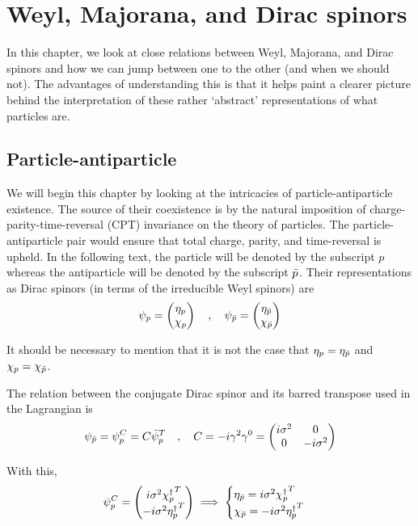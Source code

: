 \chapter{Weyl, Majorana, and Dirac spinors}
\label{ch:4}

In this chapter, we look at close relations between Weyl, Majorana, and Dirac spinors and how we can jump between one to the other (and when we should not). The advantages of understanding this is that it helps paint a clearer picture behind the interpretation of these rather `abstract' representations of what particles are. 

\section{Particle-antiparticle}
\label{ch:4:particle-antiparticle}
We will begin this chapter by looking at the intricacies of particle-antiparticle existence. The source of their coexistence is by the natural imposition of charge-parity-time-reversal (CPT) invariance on the theory of particles. The particle-antiparticle pair would ensure that total charge, parity, and time-reversal is upheld. In the following text, the particle will be denoted by the subscript $p$ whereas the antiparticle will be denoted by the subscript ${\Bar{p}}$. Their representations as Dirac spinors (in terms of the irreducible Weyl spinors) are
\begin{equation*}
    \psi_p = \begin{pmatrix}{\eta_p}\\{\chi_p}\end{pmatrix} \quad , \quad \psi_{\Bar{p}} = \begin{pmatrix}{\eta_{\Bar{p}}}\\{\chi_{\Bar{p}}}\end{pmatrix}
\end{equation*}

It should be necessary to mention that it is not the case that $\eta_p = \eta_{\Bar{p}}$ and $\chi_p=\chi_{\Bar{p}}$.

The relation between the conjugate Dirac spinor and its barred transpose used in the Lagrangian is
\begin{equation}
    \psi_{\Bar{p}} = \psi_p^C = C {\Bar{\psi}_p}^T \quad , \quad 
    C = - i \gamma^2 \gamma^0 
    = \begin{pmatrix} i \sigma^2 & 0 \\0 & - i\sigma^2\end{pmatrix}
    \label{eqn:4:particle-antiparticle:conjugate relations}
    \nonumber
\end{equation}

With this, 
\begin{equation}
    \psi_p^C = \col{i \sigma^2 {\chi_p^\dagger}^T}{-i\sigma^2{\eta_p^\dagger}^T}
    \implies 
    \begin{cases}
        \eta_{\Bar{p}} = i \sigma^2 {\chi_p^\dagger}^T \\
        \chi_{\Bar{p}} = - i \sigma^2 {\eta_p^\dagger}^T
    \end{cases}
    \label{eqn:4:particle-antiparticle:particle-antiparticle relations}
\end{equation}

